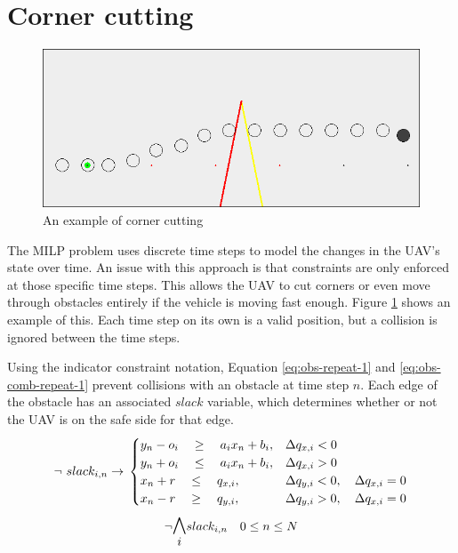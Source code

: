 \section{Corner cutting}
\label{subsec:corner-cutting}
\begin{figure}
\includegraphics[width=\textwidth]{img/cornercut_bad}
\caption{An example of corner cutting}
\label{fig:cornercut-example}
\end{figure}
The MILP problem uses discrete time steps to model the changes in the UAV's state over time. An issue with this approach is that constraints are only enforced at those specific time steps. This allows the UAV to cut corners or even move through obstacles entirely if the vehicle is moving fast enough. Figure \ref{fig:cornercut-example} shows an example of this. Each time step on its own is a valid position, but a collision is ignored between the time steps.
\par
Using the indicator constraint notation, Equation \ref{eq:obs-repeat-1} and \ref{eq:obs-comb-repeat-1} prevent collisions with an obstacle at time step $n$. Each edge of the obstacle has an associated $slack$ variable, which determines whether or not the UAV is on the safe side for that edge.
\begin{equation}
\label{eq:obs-repeat-1}
\neg ~ slack_{i,n} \rightarrow \\
\begin{cases}
y_{n} -  o_i \quad \geq 
\quad a_{i} x_{n} + b_{i},  	
& \Delta q_{x,i} < 0 							 	
 \\
y_{n} + o_i \quad \leq 
\quad a_{i} x_{n} + b_{i},
& \Delta q_{x,i} > 0 							 	
 \\
x_{n} + r \quad \leq
\quad  q_{x,i}, 		
& \Delta q_{y,i} < 0, \quad \Delta q_{x,i} = 0 	
 \\
x_{n} - r \quad \geq 
\quad q_{y,i},  		
& \Delta q_{y,i} > 0, \quad \Delta q_{x,i} = 0 	
\end{cases}
\end{equation}
\begin{equation}
\label{eq:obs-comb-repeat-1}
\neg \mathlarger{\mathlarger{\bigwedge_{i}}} slack_{i,n} \quad 0 \leq n \leq N
\end{equation}
